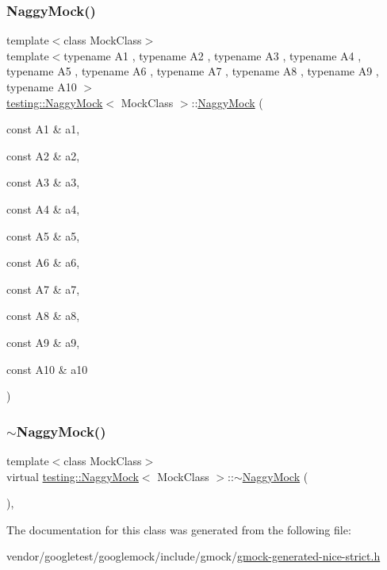 \mbox{\label{classtesting_1_1_naggy_mock_aa40a39806b939f423696f9380de3172b}} 
\subsubsection{\texorpdfstring{Naggy\+Mock()}{NaggyMock()}\hspace{0.1cm}{\footnotesize\ttfamily [11/11]}}
{\footnotesize\ttfamily template$<$class Mock\+Class$>$ \\
template$<$typename A1 , typename A2 , typename A3 , typename A4 , typename A5 , typename A6 , typename A7 , typename A8 , typename A9 , typename A10 $>$ \\
\hyperlink{classtesting_1_1_naggy_mock}{testing\+::\+Naggy\+Mock}$<$ Mock\+Class $>$\+::\hyperlink{classtesting_1_1_naggy_mock}{Naggy\+Mock} (\begin{DoxyParamCaption}\item[{const A1 \&}]{a1,  }\item[{const A2 \&}]{a2,  }\item[{const A3 \&}]{a3,  }\item[{const A4 \&}]{a4,  }\item[{const A5 \&}]{a5,  }\item[{const A6 \&}]{a6,  }\item[{const A7 \&}]{a7,  }\item[{const A8 \&}]{a8,  }\item[{const A9 \&}]{a9,  }\item[{const A10 \&}]{a10 }\end{DoxyParamCaption})\hspace{0.3cm}{\ttfamily [inline]}}

\mbox{\label{classtesting_1_1_naggy_mock_a4d314aa583c985502eaec875440394ca}} 
\subsubsection{\texorpdfstring{$\sim$\+Naggy\+Mock()}{~NaggyMock()}}
{\footnotesize\ttfamily template$<$class Mock\+Class$>$ \\
virtual \hyperlink{classtesting_1_1_naggy_mock}{testing\+::\+Naggy\+Mock}$<$ Mock\+Class $>$\+::$\sim$\hyperlink{classtesting_1_1_naggy_mock}{Naggy\+Mock} (\begin{DoxyParamCaption}{ }\end{DoxyParamCaption})\hspace{0.3cm}{\ttfamily [inline]}, {\ttfamily [virtual]}}



The documentation for this class was generated from the following file\+:\begin{DoxyCompactItemize}
\item 
vendor/googletest/googlemock/include/gmock/\hyperlink{gmock-generated-nice-strict_8h}{gmock-\/generated-\/nice-\/strict.\+h}\end{DoxyCompactItemize}
